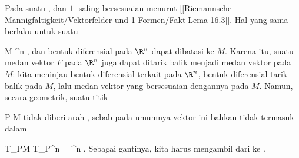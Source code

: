 {}
{

Pada suatu
,
dan
$1$-
saling bersesuaian menurut
[[Riemannsche Mannigfaltigkeit/Vektorfelder und 1-Formen/Fakt|Lema 16.3]].
Hal yang sama berlaku untuk suatu

\mavergleichskette
{\vergleichskette
{ M
}
{ \subseteq }{ \R^n
}
{  }{
}
{    }{
}
{   }{
}
}
{}{}{,}
dan bentuk diferensial pada $\R^n$ dapat dibatasi ke $M$. Karena itu, suatu medan vektor $F$ pada $\R^n$ juga dapat ditarik balik menjadi medan vektor pada $M$: kita meninjau bentuk diferensial terkait pada $\R^n$, bentuk diferensial tarik balik pada $M$, lalu medan vektor yang bersesuaian dengannya pada $M$. Namun, secara geometrik, suatu titik

\mavergleichskette
{\vergleichskette
{ P
}
{ \in }{ M
}
{  }{
}
{    }{
}
{   }{
}
}
{}{}{}
tidak diberi arah
, sebab pada umumnya vektor ini bahkan tidak termasuk dalam

\mavergleichskette
{\vergleichskette
{ T_PM
}
{ \subseteq }{ T_P\R^n
}
{ = }{ \R^n
}
{    }{
}
{   }{
}
}
{}{}{.}
Sebagai gantinya, kita harus mengambil
dari
 ke
 {} {.}

}

